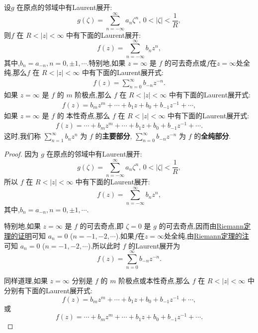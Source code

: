 \documentclass[../../main.tex]{subfiles}
\begin{document}
\begin{proposition}\label{proposition:无穷远点为孤立奇点时的Laurent展开}
设\( g \) 在原点的邻域中有Laurent展开:
\[
g(\zeta) = \sum_{n = -\infty}^{\infty} a_n \zeta^n, \, 0 < |\zeta| < \frac{1}{R},
\]
则\( f \) 在 \( R < |z| < \infty \) 中有下面的Laurent展开:
\[
f(z) = \sum_{n = -\infty}^{\infty} b_n z^n,
\]
其中,\( b_n = a_{-n}, n = 0, \pm 1, \cdots \).特别地,如果 \( z = \infty \) 是 \( f \) 的可去奇点或$f$在$z=\infty$处全纯,那么\( f \) 在 \( R < |z| < \infty \) 中有下面的Laurent展开式:
\begin{align}\label{eq:::--1232-3}
f(z) = \sum_{n = 0}^{\infty} b_{-n} z^{-n}.
\end{align}
如果 \( z = \infty \) 是 \( f \) 的 \( m \) 阶极点,那么 \( f \) 在 \( R < |z| < \infty \) 中有下面的Laurent展开式:
\begin{align}\label{eq:::--1232-4}
f(z) = b_m z^m + \cdots + b_1 z + b_0 + b_{-1} z^{-1} + \cdots,
\end{align}
如果 \( z = \infty \) 是 \( f \) 的 本性奇点,那么 \( f \) 在 \( R < |z| < \infty \) 中有下面的Laurent展开式:
\begin{align}\label{eq:::--1232-5}
f(z) = \cdots + b_m z^m + \cdots + b_1 z + b_0 + b_{-1} z^{-1} + \cdots.
\end{align}
这时,我们称 \( \sum_{n = 1}^{\infty} b_n z^n \) 为 \( f \) 的\textbf{主要部分}, \( \sum_{n = 0}^{\infty} b_{-n} z^{-n} \) 为 \( f \) 的\textbf{全纯部分}.
\end{proposition}
\begin{proof}
因为 \( g \) 在原点的邻域中有Laurent展开:
\[
g(\zeta) = \sum_{n = -\infty}^{\infty} a_n \zeta^n, \, 0 < |\zeta| < \frac{1}{R},
\]
所以 \( f \) 在 \( R < |z| < \infty \) 中有下面的Laurent展开:
\[
f(z) = \sum_{n = -\infty}^{\infty} b_n z^n,
\]
其中,\( b_n = a_{-n}, n = 0, \pm 1, \cdots \).

特别地,如果 \( z = \infty \) 是 \( f \) 的可去奇点,即 \( \zeta = 0 \) 是 \( g \) 的可去奇点,因而由\hyperref[theorem:Riemann定理-定理5.2.1]{Riemann定理的证明}可知 \( a_n = 0 \) (\( n = -1, -2, \cdots \)).如果$f$在$z=\infty$处全纯,由\hyperref[theorem:Riemann定理-定理5.2.1]{Riemann定理的注}可知 \( a_n = 0 \) (\( n = -1, -2, \cdots \)).所以此时 \( f \) 的Laurent展开为
\[
f(z) = \sum_{n = 0}^{\infty} b_{-n} z^{-n}.
\]

同样道理,如果 \( z = \infty \) 分别是 \( f \) 的 \( m \) 阶极点或本性奇点,那么 \( f \) 在 \( R < |z| < \infty \) 中分别有下面的Laurent展开式:
\[
f(z) = b_m z^m + \cdots + b_1 z + b_0 + b_{-1} z^{-1} + \cdots, 
\]
或
\[
f(z) = \cdots + b_m z^m + \cdots + b_1 z + b_0 + b_{-1} z^{-1} + \cdots. 
\]
\end{proof}
\end{document}
